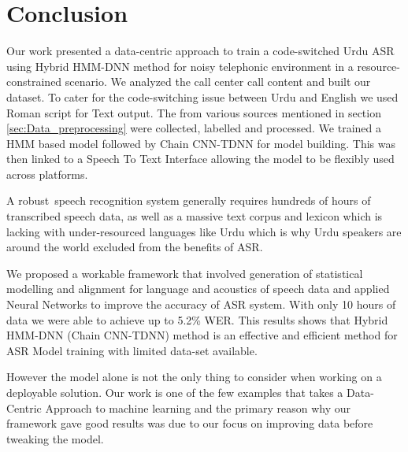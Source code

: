\documentclass[3p,times]{elsarticle}
\begin{document}
\section{Conclusion} %
\label{cha:discussion_conclusion}
Our work presented a data-centric approach to train a code-switched Urdu ASR using Hybrid HMM-DNN method for noisy telephonic environment in a resource-constrained scenario. We analyzed the call center call content and built our dataset. To cater for the code-switching issue between Urdu and English we used Roman script for Text output. The from various sources mentioned in section \ref{sec:Data_preprocessing} were collected, labelled and processed. We trained a HMM based model followed by Chain CNN-TDNN for model building. This was then linked to a Speech To Text Interface allowing the model to be flexibly used across platforms.


A robust speech recognition system generally requires hundreds of hours of transcribed speech data, as well as a massive text corpus and lexicon which is lacking with under-resourced languages like Urdu which is why Urdu speakers are around the world excluded from the benefits of ASR.

We proposed a workable framework that involved generation of statistical modelling and alignment for language and acoustics of speech data and applied Neural Networks to improve the accuracy of ASR system. With only 10 hours of data we were able to achieve up to 5.2\% WER. This results shows that Hybrid HMM-DNN (Chain CNN-TDNN) method is an effective and efficient method for ASR Model training with limited data-set available. 

However the model alone is not the only thing to consider when working on a deployable solution. Our work is one of the few examples that takes a Data-Centric Approach to machine learning and the primary reason why our framework gave good results was due to our focus on improving data before tweaking the model.
\end{document}
